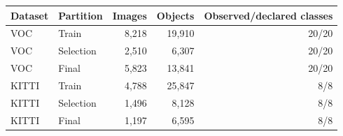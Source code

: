 \begin{tabular}{llrrr}
\toprule
Dataset & Partition & Images & Objects & Observed/declared classes \\
\midrule
VOC & Train & 8,218 & 19,910 & 20/20 \\
VOC & Selection & 2,510 & 6,307 & 20/20 \\
VOC & Final & 5,823 & 13,841 & 20/20 \\
KITTI & Train & 4,788 & 25,847 & 8/8 \\
KITTI & Selection & 1,496 & 8,128 & 8/8 \\
KITTI & Final & 1,197 & 6,595 & 8/8 \\
\bottomrule
\end{tabular}
